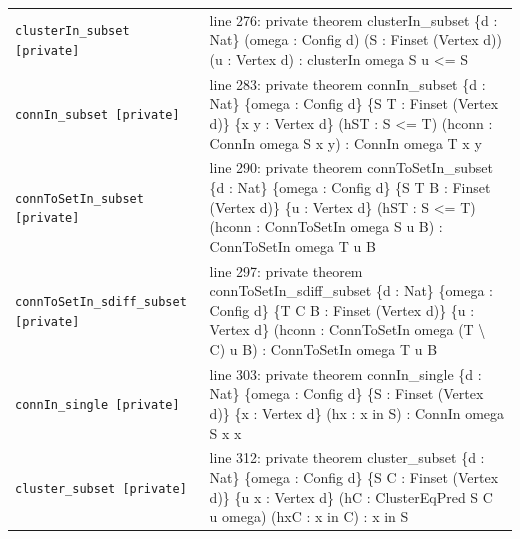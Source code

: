 \documentclass[10pt]{article}
\begin{document}
\begin{longtable}{>{\raggedright\arraybackslash}p{} >{\raggedright\arraybackslash}p{}}
\texttt{clusterIn\_\allowbreak{}subset [private]} & {\ttfamily\scriptsize line 276:\allowbreak{} private theorem clusterIn\_\allowbreak{}subset \{d :\allowbreak{} Nat\} (\allowbreak{}omega :\allowbreak{} Config d)\allowbreak{} (\allowbreak{}S :\allowbreak{} Finset (\allowbreak{}Vertex d)\allowbreak{})\allowbreak{} (\allowbreak{}u :\allowbreak{} Vertex d)\allowbreak{} :\allowbreak{} clusterIn omega S u <=\allowbreak{} S} \\[0.45em]
\texttt{connIn\_\allowbreak{}subset [private]} & {\ttfamily\scriptsize line 283:\allowbreak{} private theorem connIn\_\allowbreak{}subset \{d :\allowbreak{} Nat\} \{omega :\allowbreak{} Config d\} \{S T :\allowbreak{} Finset (\allowbreak{}Vertex d)\allowbreak{}\} \{x y :\allowbreak{} Vertex d\} (\allowbreak{}hST :\allowbreak{} S <=\allowbreak{} T)\allowbreak{} (\allowbreak{}hconn :\allowbreak{} ConnIn omega S x y)\allowbreak{} :\allowbreak{} ConnIn omega T x y} \\[0.45em]
\texttt{connToSetIn\_\allowbreak{}subset [private]} & {\ttfamily\scriptsize line 290:\allowbreak{} private theorem connToSetIn\_\allowbreak{}subset \{d :\allowbreak{} Nat\} \{omega :\allowbreak{} Config d\} \{S T B :\allowbreak{} Finset (\allowbreak{}Vertex d)\allowbreak{}\} \{u :\allowbreak{} Vertex d\} (\allowbreak{}hST :\allowbreak{} S <=\allowbreak{} T)\allowbreak{} (\allowbreak{}hconn :\allowbreak{} ConnToSetIn omega S u B)\allowbreak{} :\allowbreak{} ConnToSetIn omega T u B} \\[0.45em]
\texttt{connToSetIn\_\allowbreak{}sdiff\_\allowbreak{}subset [private]} & {\ttfamily\scriptsize line 297:\allowbreak{} private theorem connToSetIn\_\allowbreak{}sdiff\_\allowbreak{}subset \{d :\allowbreak{} Nat\} \{omega :\allowbreak{} Config d\} \{T C B :\allowbreak{} Finset (\allowbreak{}Vertex d)\allowbreak{}\} \{u :\allowbreak{} Vertex d\} (\allowbreak{}hconn :\allowbreak{} ConnToSetIn omega (\allowbreak{}T \textbackslash{} C)\allowbreak{} u B)\allowbreak{} :\allowbreak{} ConnToSetIn omega T u B} \\[0.45em]
\texttt{connIn\_\allowbreak{}single [private]} & {\ttfamily\scriptsize line 303:\allowbreak{} private theorem connIn\_\allowbreak{}single \{d :\allowbreak{} Nat\} \{omega :\allowbreak{} Config d\} \{S :\allowbreak{} Finset (\allowbreak{}Vertex d)\allowbreak{}\} \{x :\allowbreak{} Vertex d\} (\allowbreak{}hx :\allowbreak{} x in S)\allowbreak{} :\allowbreak{} ConnIn omega S x x} \\[0.45em]
\texttt{cluster\_\allowbreak{}subset [private]} & {\ttfamily\scriptsize line 312:\allowbreak{} private theorem cluster\_\allowbreak{}subset \{d :\allowbreak{} Nat\} \{omega :\allowbreak{} Config d\} \{S C :\allowbreak{} Finset (\allowbreak{}Vertex d)\allowbreak{}\} \{u x :\allowbreak{} Vertex d\} (\allowbreak{}hC :\allowbreak{} ClusterEqPred S C u omega)\allowbreak{} (\allowbreak{}hxC :\allowbreak{} x in C)\allowbreak{} :\allowbreak{} x in S} \\[0.45em]

\end{longtable}
\end{document}
